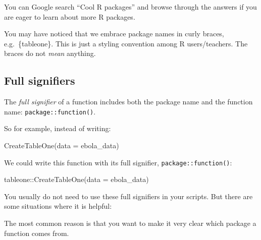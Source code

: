 \documentclass[
  letterpaper,
  DIV=11,
  numbers=noendperiod]{scrreprt}
\newenvironment{Shaded}{\begin{snugshade}}{\end{snugshade}}
\newcommand{\AttributeTok}[1]{\textcolor[rgb]{0.40,0.45,0.13}{#1}}
\newcommand{\FunctionTok}[1]{\textcolor[rgb]{0.28,0.35,0.67}{#1}}
\newcommand{\NormalTok}[1]{\textcolor[rgb]{0.00,0.23,0.31}{#1}}
\newcommand{\SpecialCharTok}[1]{\textcolor[rgb]{0.37,0.37,0.37}{#1}}
\begin{document}
You can Google search ``Cool R packages'' and browse through the answers
if you are eager to learn about more R packages.

\begin{tcolorbox}[enhanced jigsaw, titlerule=0mm, colback=white, left=2mm, breakable, opacitybacktitle=0.6, colbacktitle=quarto-callout-note-color!10!white, colframe=quarto-callout-note-color-frame, bottomtitle=1mm, opacityback=0, coltitle=black, arc=.35mm, toptitle=1mm, title=\textcolor{quarto-callout-note-color}{\faInfo}\hspace{0.5em}{Side Note}, leftrule=.75mm, toprule=.15mm, bottomrule=.15mm, rightrule=.15mm]

You may have noticed that we embrace package names in curly braces,
e.g.~\{tableone\}. This is just a styling convention among R
users/teachers. The braces do not \emph{mean} anything.

\end{tcolorbox}

\subsection{Full signifiers}\label{full-signifiers}

The \emph{full signifier} of a function includes both the package name
and the function name: \texttt{package::function()}.

So for example, instead of writing:

\begin{Shaded}
\begin{Highlighting}[]
\FunctionTok{CreateTableOne}\NormalTok{(}\AttributeTok{data =}\NormalTok{ ebola\_data)}
\end{Highlighting}
\end{Shaded}

We could write this function with its full signifier,
\texttt{package::function()}:

\begin{Shaded}
\begin{Highlighting}[]
\NormalTok{tableone}\SpecialCharTok{::}\FunctionTok{CreateTableOne}\NormalTok{(}\AttributeTok{data =}\NormalTok{ ebola\_data)}
\end{Highlighting}
\end{Shaded}

You usually do not need to use these full signifiers in your scripts.
But there are some situations where it is helpful:

The most common reason is that you want to make it very clear which
package a function comes from.
\end{document}
